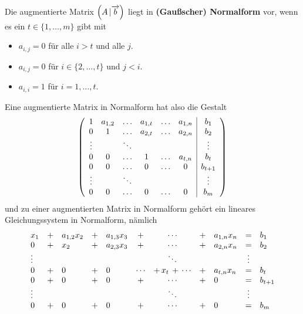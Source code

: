 \begin{definition} Die augmentierte Matrix $\left(A \, \vert \overrightarrow{b}\right)$ liegt in 
\textbf{(Gaußscher) Normalform} vor, 
wenn es ein $t \in \{1, \ldots, m \}$ gibt mit
\begin{itemize}
\item $a_{i,j} = 0$ für alle $i > t$ und alle $j$.
\item $a_{i,j} = 0$ für $i \in \{2, \ldots, t\}$ und $j < i$.
\item $a_{i,i} = 1$ für $i = 1, \ldots, t$.
\end{itemize}
\end{definition}

Eine augmentierte Matrix in Normalform hat also die Gestalt
  	$$ \left( \begin{array} { c c c c c c | c}
	1 & a_{1,2} & \ldots & a_{1,t} & \ldots & a_{1,n} &  b_1 \\
  	0 & 1 & \ldots & a_{2,t} & \ldots & a_{2, n} &  b_2 \\
  	\vdots & & \ddots & & & & \vdots \\
  	0 & 0 & \ldots & 1 & \ldots & a_{t,n} &  b_t \\
   	0 & 0 & \ldots & 0 & \ldots & 0 &  b_{t+1} \\
  	\vdots & & \ddots & & & &  \vdots \\
   	0 & 0 & \ldots & 0 & \ldots & 0 &  b_m 
  	\end{array} \right) $$
und zu einer augmentierten Matrix in Normalform gehört ein lineares Gleichungssystem in Normalform, 
nämlich 
  	$$   \begin{array} {l c l c l c c c l c l }
  	x_1 & + & a_{1,2} x_2 & + & a_{1,3} x_3 & + & \cdots & + & a_{1,n} x_n & = & b_1 \\
  	0 & + &  x_2 &  + & a_{2,3} x_3 & + & \cdots & + & a_{2,n} x_n & = & b_2 \\
 	\vdots & & &  & & & \ddots & & & \vdots \\
  	0 & + & 0 & + & 0 &  \cdots &  + \, x_t \, +  \, \cdots & + & a_{t,n} x_n & = & b_t \\  
  	0 & + & 0 & + & 0 & + & \cdots & + & 0 & = & b_{t+1} \\
  	\vdots & &  & & & & \ddots  & & & \vdots \\
  	0 & + & 0 & + & 0 & + & \cdots & + & 0 & = & b_m 
  	\end{array}  $$


